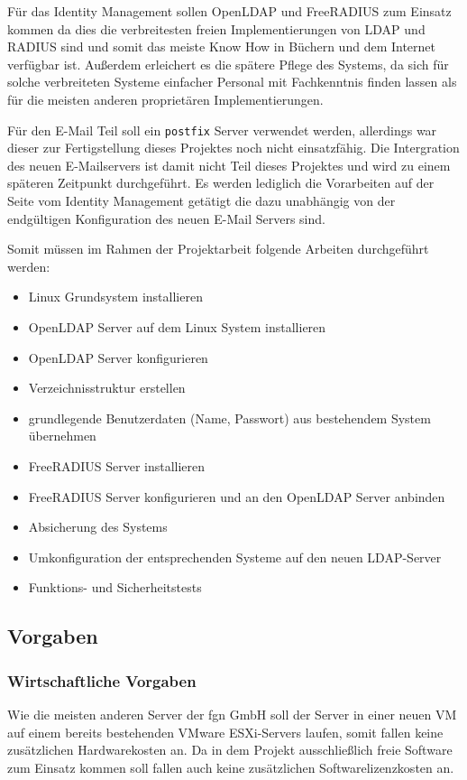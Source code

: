 \documentclass[11pt,a4paper,titlepage=firstiscover]{scrartcl} %
\begin{document}
Für das Identity Management sollen OpenLDAP und FreeRADIUS zum Einsatz kommen da dies die verbreitesten freien Implementierungen von LDAP und RADIUS sind und somit das meiste Know How in Büchern und dem Internet verfügbar ist. Außerdem erleichert es die spätere Pflege des Systems, da sich für solche verbreiteten Systeme einfacher Personal mit Fachkenntnis finden lassen als für die meisten anderen proprietären Implementierungen.

Für den E-Mail Teil soll ein \texttt{postfix} Server verwendet werden, allerdings war dieser zur Fertigstellung dieses Projektes noch nicht einsatzfähig. Die Intergration des neuen E-Mailservers ist damit nicht Teil dieses Projektes und wird zu einem späteren Zeitpunkt durchgeführt. Es werden lediglich die Vorarbeiten auf der Seite vom Identity Management getätigt die dazu unabhängig von der endgültigen Konfiguration des neuen E-Mail Servers sind.

\medskip \noindent 		%
Somit müssen im Rahmen der Projektarbeit folgende Arbeiten durchgeführt werden: 
\begin{itemize}
\item Linux Grundsystem installieren
\item OpenLDAP Server auf dem Linux System installieren
\item OpenLDAP Server konfigurieren
\item Verzeichnisstruktur erstellen
\item grundlegende Benutzerdaten (Name, Passwort) aus bestehendem System übernehmen
\item FreeRADIUS Server installieren
\item FreeRADIUS Server konfigurieren und an den OpenLDAP Server anbinden
\item Absicherung des Systems
\item Umkonfiguration der entsprechenden Systeme auf den neuen LDAP-Server
\item Funktions- und Sicherheitstests
\end{itemize}


\subsection{Vorgaben}
\subsubsection{Wirtschaftliche Vorgaben}
Wie die meisten anderen Server der fgn GmbH soll der Server in einer neuen VM auf einem bereits bestehenden VMware ESXi-Servers laufen, somit fallen keine zusätzlichen Hardwarekosten an. Da in dem Projekt  ausschließlich freie Software zum Einsatz kommen soll fallen auch keine zusätzlichen Softwarelizenzkosten an.
\end{document}
